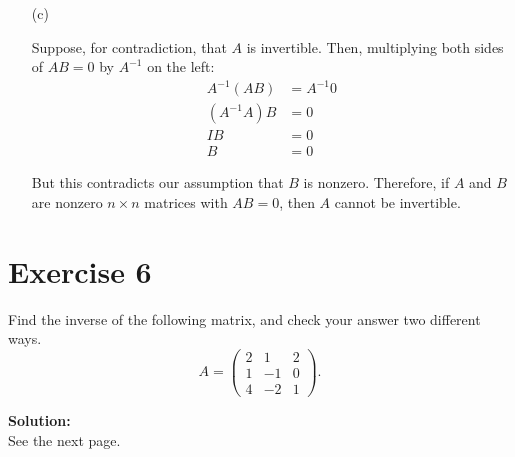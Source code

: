 \documentclass{article}
\begin{document}
\begin{enumerate}
\item[(c)]

Suppose, for contradiction, that $A$ is invertible. Then, multiplying both sides of $AB = 0$ by $A^{-1}$ on the left:
\begin{align*}
A^{-1}(AB) &= A^{-1}0 \\
(A^{-1}A)B &= 0 \\
IB &= 0 \\
B &= 0
\end{align*}

But this contradicts our assumption that $B$ is nonzero. Therefore, if $A$ and $B$ are nonzero $n \times n$ matrices with $AB = 0$, then $A$ cannot be invertible.
\end{enumerate}

\newpage

\section*{Exercise 6}
Find the inverse of the following matrix, and check your answer two different ways.
$$A = \begin{pmatrix} 2 & 1 & 2 \\ 1 & -1 & 0 \\ 4 & -2 & 1 \end{pmatrix}.$$

\textbf{Solution: } \\

See the next page.
\end{document}
